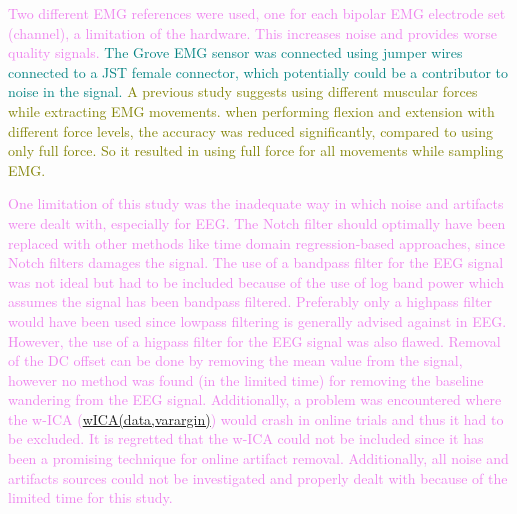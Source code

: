 \textcolor{violet}{Two different EMG references were used, one for each bipolar EMG electrode set (channel), a limitation of the hardware. This increases noise and provides worse quality signals.}
\textcolor{teal}{The Grove EMG sensor was connected using jumper wires connected to a JST female connector, which potentially could be a contributor to noise in the signal.}
\textcolor{olive}{A previous study suggests using different muscular forces while extracting EMG movements\:\cite{vidovicImprovingRobustnessMyoelectric2016}. 
when performing flexion and extension with different force levels, the accuracy was reduced significantly, compared to using only full force. So it resulted in using full force for all movements while sampling EMG.}

\textcolor{violet}{One limitation of this study was the inadequate way in which noise and artifacts were dealt with, especially for EEG. The Notch filter should optimally have been replaced with other methods like time domain regression-based approaches, since Notch filters damages the signal\:\cite{widmannDigitalFilterDesign2015}. The use of a bandpass filter for the EEG signal was not ideal but had to be included because of the use of log band power which assumes the signal has been bandpass filtered\:\cite{blankertzOptimizingSpatialFilters2008}. Preferably only a highpass filter would have been used since lowpass filtering is generally advised against in EEG\:\cite{vanrullenFourCommonConceptual2011}\cite{widmannDigitalFilterDesign2015}. However, the use of a higpass filter for the EEG signal was also flawed. Removal of the DC offset can be done by removing the mean value from the signal\:\cite{islamSignalArtifactsTechniques2021}, however no method was found (in the limited time) for removing the baseline wandering from the EEG signal.}
\textcolor{violet}{Additionally, a problem was encountered where the w-ICA (\href{https://se.mathworks.com/matlabcentral/fileexchange/55413-wica-data-varargin}{wICA(data,varargin)}) would crash in online trials and thus it had to be excluded. It is regretted that the w-ICA could not be included since it has been a promising technique for online artifact removal\:\cite{islamSignalArtifactsTechniques2021}\textcolor{olive}{\cite{minguillonTrendsEEGBCIDailylife2017}}\cite{dalyFORCeFullyOnline2015}\cite{gabard-durnamHarvardAutomatedProcessing2018}.}
\textcolor{violet}{Additionally, all noise and artifacts sources could not be investigated and properly dealt with because of the limited time for this study.}

